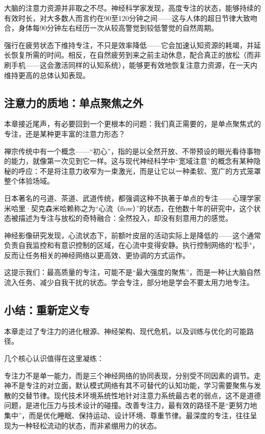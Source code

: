 \documentclass[11pt]{article}
\begin{document}
大脑的注意力资源并非取之不尽。神经科学家发现，高度专注的状态，能够持续的有效时长，对大多数人而言约在90至120分钟之间——这与人体的超日节律大致吻合，身体每90分钟左右经历一次从较高警觉到较低警觉的自然周期。

强行在疲劳状态下维持专注，不只是效率降低——它会加速认知资源的耗竭，并延长恢复所需的时间。相反，在自然疲劳到来之前主动休息，配合真正的放松（而非刷手机——这会激活同样的认知系统），能够更有效地恢复注意力资源，在一天内维持更高的总体认知表现。
\subsection{注意力的质地：单点聚焦之外}
\label{sec:org3953150}

本章接近尾声，有必要回到一个更根本的问题：我们真正需要的，是单点聚焦式的专注，还是某种更丰富的注意力形态？

禅宗传统中有一个概念——“初心”，指的是以全然开放、不带预设的眼光看待事物的能力，就像第一次见到它一样。这与现代神经科学中“宽域注意”的概念有某种隐秘的呼应：不是将注意力收窄为一束激光，而是让它以一种柔软、宽广的方式笼罩整个体验场域。

日本著名的弓道、茶道、武道传统，都强调这种不执著于单点的专注——心理学家米哈里·契克森米哈赖称之为“心流（flow）”的状态，在他数十年的研究中，这个状态被描述为专注与放松的奇特融合：全然投入，却没有刻意用力的感觉。

神经影像研究发现，心流状态下，前额叶皮层的活动实际上是降低的——这个通常负责自我监控和有意识控制的区域，在心流中变得安静。执行控制网络的"松手"，反而让任务相关的神经网络以更高效、更协调的方式运作。

这提示我们：最高质量的专注，可能不是“最大强度的聚焦”，而是一种让大脑自然流入任务、减少自我干扰的状态。学会专注，部分地是学会不要太用力地专注。
\subsection{小结：重新定义专}
\label{sec:orgfbc310b}

本章走过了专注力的进化根源、神经架构、现代危机，以及训练与优化的可能路径。

几个核心认识值得在这里凝练：

专注力不是单一能力，而是三个神经网络的协同表现，分别受不同因素的调节。走神不是专注的对立面，默认模式网络有其不可替代的认知功能，学习需要聚焦与发散的交替节律。现代技术环境系统性地针对注意力系统最古老的弱点，这不是道德问题，是进化压力与技术设计的碰撞。改善专注力，最有效的路径不是“更努力地集中”，而是优化睡眠、保持运动、设计环境、尊重节律。最深度的专注，往往呈现为一种轻松流动的状态，而非紧绷用力的状态。
\end{document}
